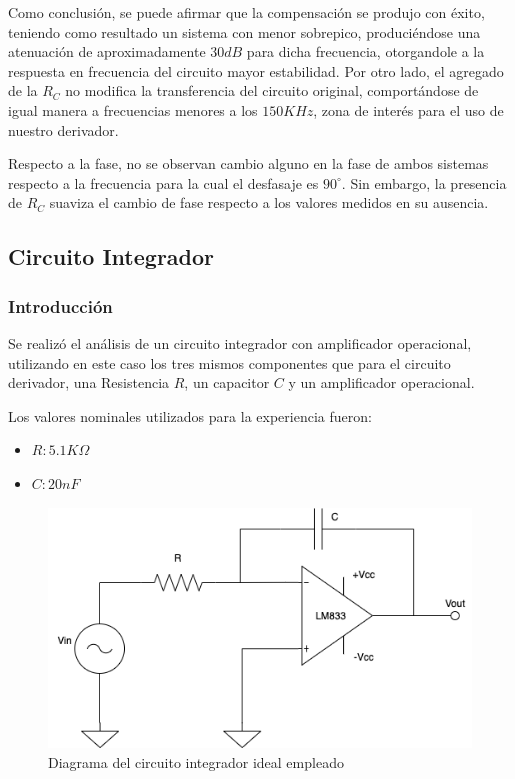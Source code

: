 Como conclusión, se puede afirmar que la compensación se produjo con éxito, teniendo como 
resultado un sistema con menor sobrepico, produciéndose una atenuación de aproximadamente
$30dB$ para dicha frecuencia, otorgandole a la respuesta en frecuencia del circuito mayor 
estabilidad. Por otro lado, el agregado 
de la $R_C$ no modifica la transferencia del circuito original, comportándose de igual manera 
a frecuencias menores a los $150KHz$, zona de interés para el uso de nuestro derivador. \par 
Respecto a la fase, no se observan cambio alguno en la fase de ambos sistemas respecto a la frecuencia para 
la cual el desfasaje es $90^\circ$. Sin embargo, la presencia de $R_C$ suaviza el cambio de fase respecto a los
valores medidos en su ausencia.







\subsection{Circuito Integrador}

\subsubsection{Introducción}

Se realizó el análisis de un circuito integrador con amplificador operacional, utilizando en este caso los tres mismos componentes que para el circuito
derivador, una Resistencia $R$,
un capacitor $C$ y un amplificador operacional. 

Los valores nominales utilizados para la experiencia fueron:

\begin{itemize}
	\item $R: 5.1K \Omega$ 
	\item $C: 20nF$
\end{itemize}

\begin{figure}[H]
    \centering 
    \includegraphics [scale=0.5] {../Ejercicio3-CircuitoIntegradoresyDerivadores/Imagenes/diagrama-integrador.png} 
    \caption{Diagrama del circuito integrador ideal empleado}
    \label{fig:emptyPlotTool}
\end{figure}

